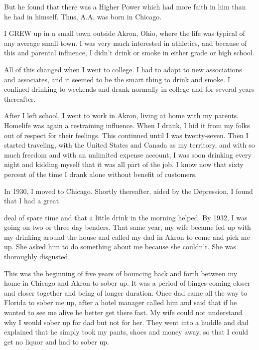 

\bbChapterPreamble




\begin{biblechapter}
    But he found that there was a Higher Power 
    which had more faith in him than he had in himself.
Thus, A.A. was born in Chicago.
\end{biblechapter}


\begin{biblechapter}
    I GREW up in a small town outside Akron, Ohio, 
    where the life was typical of any average small town.
\verse I was very much interested in athletics, 
    and because of this and parental influence, 
    I didn’t drink or smoke in either grade or high school.

\verse All of this changed when I went to college.
\verse I had to adapt to new associations and associates, 
    and it seemed to be the smart thing to drink and smoke.
\verse I confined drinking to weekends 
    and drank normally in college 
    and for several years thereafter.

\verse After I left school, I went to work in Akron, living at home with my parents. Homelife was again a restraining influence. When I drank, I hid it from my folks out of respect for their feelings. This continued until I was twenty-seven. Then I started traveling, with the United States and Canada as my territory, and with so much freedom and with an unlimited expense account, I was soon drinking every night and kidding myself that it was all part of the job. I know now that sixty percent of the time I drank alone without benefit of customers.

In 1930, I moved to Chicago. Shortly thereafter, aided by the Depression, I found that I had a great

deal of spare time and that a little drink in the morning helped. By 1932, I was going on two or three day benders. That same year, my wife became fed up with my drinking around the house and called my dad in Akron to come and pick me up. She asked him to do something about me because she couldn’t. She was thoroughly disgusted.

This was the beginning of five years of bouncing back and forth between my home in Chicago and Akron to sober up. It was a period of binges coming closer and closer together and being of longer duration. Once dad came all the way to Florida to sober me up, after a hotel manager called him and said that if he wanted to see me alive he better get there fast. My wife could not understand why I would sober up for dad but not for her. They went into a huddle and dad explained that he simply took my pants, shoes and money away, so that I could get no liquor and had to sober up.


\end{biblechapter}
